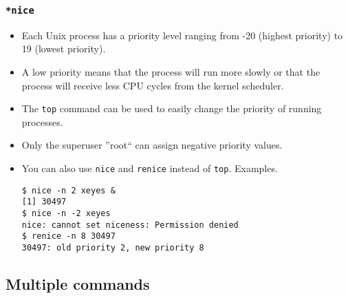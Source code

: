 \ifEXTRA
\begin{frame}[fragile]\frametitle{\texttt{*nice}}
\begin{itemize}
\item Each Unix process has a priority level ranging from -20 (highest priority) 
to 19 (lowest priority).
\item A low priority means that the process will run more slowly or that the process 
will receive less CPU cycles from the kernel scheduler. 
\item The \verb|top| command can be used to easily change the priority of running processes.
\item Only the superuser ''root`` can assign negative priority values.
\item You can also use \texttt{nice} and \texttt{renice} instead of \texttt{top}. 
Examples.
\begin{lstlisting}
$ nice -n 2 xeyes &
[1] 30497
$ nice -n -2 xeyes
nice: cannot set niceness: Permission denied
$ renice -n 8 30497
30497: old priority 2, new priority 8
\end{lstlisting}
\end{itemize}
\end{frame}
\fi


\subsection{Multiple commands}

